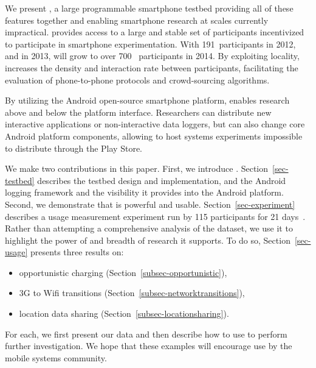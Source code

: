 We present \PhoneLab{}, a large programmable smartphone testbed providing all
of these features together and enabling smartphone research at scales
currently impractical. \PhoneLab{} provides access to a large and stable set
of participants incentivized to participate in smartphone experimentation.
With 191~participants in 2012, and  in 2013, \PhoneLab{} will
grow to over 700~ participants in 2014. By exploiting
locality, \PhoneLab{} increases the density and interaction rate between
participants, facilitating the evaluation of phone-to-phone protocols and
crowd-sourcing algorithms.~

By utilizing the Android open-source smartphone platform, \PhoneLab{} enables
research above and below the platform interface. Researchers can distribute
new interactive applications or non-interactive data loggers, but can also
change core Android platform components, allowing \PhoneLab{} to host systems
experiments impossible to distribute through the Play Store.

We make two contributions in this paper. First, we introduce \PhoneLab{}.
Section~\ref{sec-testbed} describes the testbed design and implementation,
and the Android logging framework and the visibility it provides into the
Android platform. Second, we demonstrate that \PhoneLab{} is powerful and
usable. Section~\ref{sec-experiment} describes a usage measurement experiment
run by 115 \PhoneLab{} participants for 21 days~. Rather
than attempting a comprehensive analysis of the dataset, we use it to
highlight the power of \PhoneLab{} and breadth of research it supports. To do
so, Section~\ref{sec-usage} presents three results on:

\begin{itemize}
\item opportunistic charging (Section~\ref{subsec-opportunistic}),
\item 3G to Wifi transitions (Section~\ref{subsec-networktransitions}),
\item location data sharing (Section~\ref{subsec-locationsharing}).
\end{itemize}

For each, we first present our data and then describe how to use \PhoneLab{}
to perform further investigation. We hope that these examples will encourage
\PhoneLab{} use by the mobile systems community.
